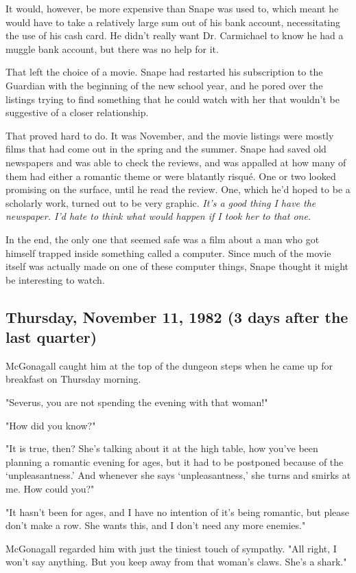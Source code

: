 It would, however, be more expensive than Snape was used to, which meant he would have to take a relatively large sum out of his bank account, necessitating the use of his cash card. He didn't really want Dr. Carmichael to know he had a muggle bank account, but there was no help for it.

That left the choice of a movie. Snape had restarted his subscription to the Guardian with the beginning of the new school year, and he pored over the listings trying to find something that he could watch with her that wouldn't be suggestive of a closer relationship.

That proved hard to do. It was November, and the movie listings were mostly films that had come out in the spring and the summer. Snape had saved old newspapers and was able to check the reviews, and was appalled at how many of them had either a romantic theme or were blatantly risqué. One or two looked promising on the surface, until he read the review. One, which he'd hoped to be a scholarly work, turned out to be very graphic. \emph{It's a good thing I have the newspaper. I'd hate to think what would happen if I took her to that one.}

In the end, the only one that seemed safe was a film about a man who got himself trapped inside something called a computer. Since much of the movie itself was actually made on one of these computer things, Snape thought it might be interesting to watch.

\subsection{Thursday, November 11, 1982 (3 days after the last quarter)}

McGonagall caught him at the top of the dungeon steps when he came up for breakfast on Thursday morning.

"Severus, you are not spending the evening with that woman!"

"How did you know?"

"It is true, then? She's talking about it at the high table, how you've been planning a romantic evening for ages, but it had to be postponed because of the `unpleasantness.' And whenever she says `unpleasantness,' she turns and smirks at me. How could you?"

"It hasn't been for ages, and I have no intention of it's being romantic, but please don't make a row. She wants this, and I don't need any more enemies."

McGonagall regarded him with just the tiniest touch of sympathy. "All right, I won't say anything. But you keep away from that woman's claws. She's a shark."

